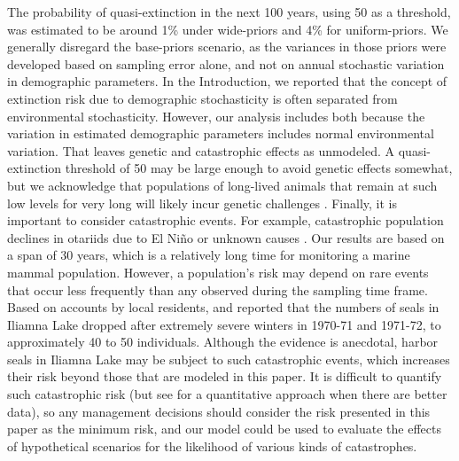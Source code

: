 \documentclass[12pt, titlepage]{article}\usepackage[]{graphicx}\usepackage[]{color}
\begin{document}
The probability of quasi-extinction in the next 100 years, using 50 as a threshold, was estimated to be around 1\% under wide-priors and 4\% for uniform-priors. We generally disregard the base-priors scenario, as the variances in those priors were developed based on sampling error alone, and not on annual stochastic variation in demographic parameters. In the Introduction, we reported that the concept of extinction risk due to demographic stochasticity is often separated from environmental stochasticity.  However, our analysis includes both because the variation in estimated demographic parameters includes normal environmental variation.  That leaves genetic and catastrophic effects as unmodeled.  A quasi-extinction threshold of 50 may be large enough to avoid genetic effects somewhat, but we acknowledge that populations of long-lived animals that remain at such low levels for very long will likely incur genetic challenges \citep{Fran:rela:1996}.  Finally, it is important to consider catastrophic events. For example, catastrophic population declines in otariids due to El Ni\~{n}o or unknown causes \citep{Gerb:Hilb:cata:2001}. Our results are based on a span of 30 years, which is a relatively long time for monitoring a marine mammal population. However, a population's risk may depend on rare events that occur less frequently than any observed during the sampling time frame. Based on accounts by local residents, \citet{Burn:unpu:1978} and \citet{Math:Klin:harb:1992} reported that the numbers of seals in Iliamna Lake dropped after extremely severe winters in 1970-71 and 1971-72, to approximately 40 to 50 individuals.  Although the evidence is anecdotal, harbor seals in Iliamna Lake may be subject to such catastrophic events, which increases their risk beyond those that are modeled in this paper.  It is difficult to quantify such catastrophic risk (but see \citet{Ward:Hilb:Towe:Gerb:stat:2007} for a quantitative approach when there are better data), so any management decisions should consider the risk presented in this paper as the minimum risk, and our model could be used to evaluate the effects of hypothetical scenarios for the likelihood of various kinds of catastrophes.
\end{document}
